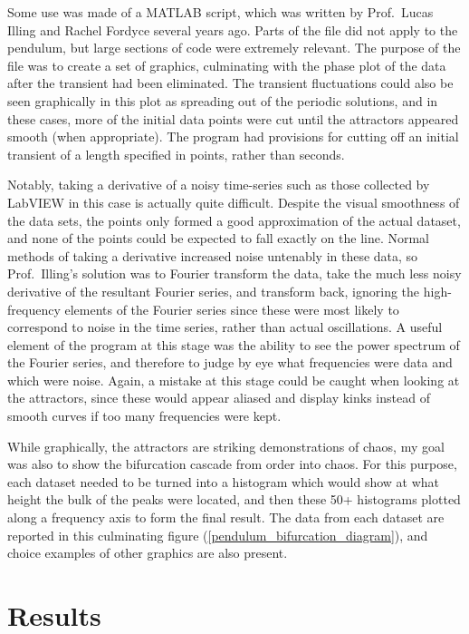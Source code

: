 \documentclass[12pt,twoside]{reedthesis}
\begin{document}
Some use was made of a MATLAB script, which was written by Prof.\ Lucas Illing and Rachel Fordyce several years ago.  Parts of the file did not apply to the pendulum, but large sections of code were extremely relevant.  The purpose of the file was to create a set of graphics, culminating with the phase plot of the data after the transient had been eliminated.  The transient fluctuations could also be seen graphically in this plot as spreading out of the periodic solutions, and in these cases, more of the initial data points were cut until the attractors appeared smooth (when appropriate).  The program had provisions for cutting off an initial transient of a length specified in points, rather than seconds.  

Notably, taking a derivative of a noisy time-series such as those collected by LabVIEW in this case is actually quite difficult.  Despite the visual smoothness of the data sets, the points only formed a good approximation of the actual dataset, and none of the points could be expected to fall exactly on the line.  Normal methods of taking a derivative increased noise untenably in these data, so Prof.\ Illing's solution was to Fourier transform the data, take the much less noisy derivative of the resultant Fourier series, and transform back, ignoring the high-frequency elements of the Fourier series since these were most likely to correspond to noise in the time series, rather than actual oscillations.  A useful element of the program at this stage was the ability to see the power spectrum of the Fourier series, and therefore to judge by eye what frequencies were data and which were noise.  Again, a mistake at this stage could be caught when looking at the attractors, since these would appear aliased and display kinks instead of smooth curves if too many frequencies were kept.  

While graphically, the attractors are striking demonstrations of chaos, my goal was also to show the bifurcation cascade from order into chaos.  For this purpose, each dataset needed to be turned into a histogram which would show at what height the bulk of the peaks were located, and then these 50+ histograms plotted along a frequency axis to form the final result.  The data from each dataset are reported in this culminating figure (\ref{pendulum_bifurcation_diagram}), and choice examples of other graphics are also present.  


\chapter{Results}
\label{results}
\end{document}
